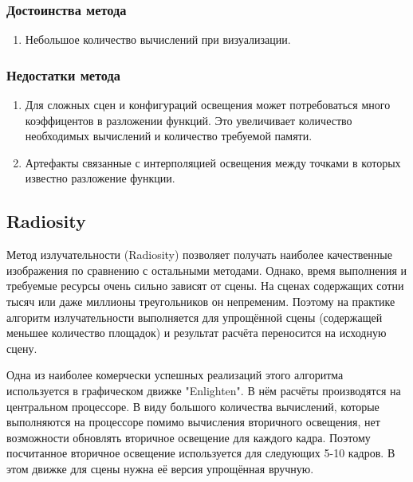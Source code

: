 \documentclass[12pt,fleqn]{article}
\begin{document}
\subsubsection{Достоинства метода}

\begin{enumerate}

\item Небольшое количество вычислений при визуализации.

\end{enumerate}

\subsubsection{Недостатки метода}

\begin{enumerate}

\item Для сложных сцен и конфигураций освещения может потребоваться много коэффицентов в разложении функций. Это увеличивает количество необходимых вычислений и количество требуемой памяти.

\item Артефакты связанные с интерполяцией освещения между точками в которых известно разложение функции.

\end{enumerate}

\subsection{Radiosity}

Метод излучательности (Radiosity) позволяет получать наиболее качественные изображения по сравнению с остальными методами. Однако, время выполнения и требуемые ресурсы очень сильно зависят от сцены. На сценах содержащих сотни тысяч или даже миллионы треугольников он непременим. Поэтому на практике алгоритм излучательности выполняется для упрощённой сцены (содержащей меньшее количество площадок) и результат расчёта переносится на исходную сцену.

Одна из наиболее комерчески успешных реализаций этого алгоритма используется в графическом движке "Enlighten". В нём расчёты производятся на центральном процессоре. В виду большого количества вычислений, которые выполняются на процессоре помимо вычисления вторичного освещения, нет возможности обновлять вторичное освещение для каждого кадра. Поэтому посчитанное вторичное освещение используется для следующих 5-10 кадров. В этом движке для сцены нужна её версия упрощённая вручную.
\end{document}
